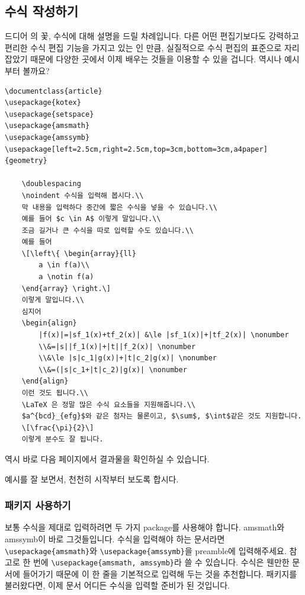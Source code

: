 
\newpage
\subsection{수식 작성하기}
\label{subsec:ams}
드디어 \lt 의 꽃, 수식에 대해 설명을 드릴 차례입니다.
다른 어떤 편집기보다도 강력하고 편리한 수식 편집 기능을 가지고 있는 \lt 인 만큼, 실질적으로 수식 편집의 표준으로 자리 잡았기 때문에 다양한 곳에서 이제 배우는 것들을 이용할 수 있을 겁니다.
역시나 예시부터 볼까요?

\begin{Verbatim}[frame=single]
\documentclass{article}
\usepackage{kotex}
\usepackage{setspace}
\usepackage{amsmath}
\usepackage{amssymb}
\usepackage[left=2.5cm,right=2.5cm,top=3cm,bottom=3cm,a4paper]{geometry}

	\doublespacing
	\noindent 수식을 입력해 봅시다.\\
	막 내용을 입력하다 중간에 짧은 수식을 넣을 수 있습니다.\\
	예를 들어 $c \in A$ 이렇게 말입니다.\\
	조금 길거나 큰 수식을 따로 입력할 수도 있습니다.\\
	예를 들어
	\[\left\{ \begin{array}{ll}
		a \in f(a)\\
		a \notin f(a)
	\end{array} \right.\]
	이렇게 말입니다.\\
	심지어
	\begin{align}
		|f(x)|=|sf_1(x)+tf_2(x)| &\le |sf_1(x)|+|tf_2(x)| \nonumber
		\\&=|s||f_1(x)|+|t||f_2(x)| \nonumber
		\\&\le |s|c_1|g(x)|+|t|c_2|g(x)| \nonumber
		\\&=(|s|c_1+|t|c_2)|g(x)| \nonumber
	\end{align}
	이런 것도 됩니다.\\
	\LaTeX 은 정말 많은 수식 요소들을 지원해줍니다.\\
	$a^{bcd}_{efg}$와 같은 첨자는 물론이고, $\sum$, $\int$같은 것도 지원합니다.
	\[\frac{\pi}{2}\]
	이렇게 분수도 잘 됩니다.

\end{Verbatim}
역시 바로 다음 페이지에서 결과물을 확인하실 수 있습니다.



예시를 잘 보면서, 천천히 시작부터 보도록 합시다.

\subsubsection{패키지 사용하기}
\label{subsec:ams-package}
보통 수식을 제대로 입력하려면 두 가지 package를 사용해야 합니다.
amsmath와 amssymb이 바로 그것들입니다.
수식을 입력해야 하는 문서라면 \verb|\usepackage{amsmath}|와 \verb|\usepackage{amssymb}|을 preamble에 입력해주세요.
참고로 한 번에 \verb|\usepackage{amsmath, amssymb}|라 쓸 수 있습니다.
수식은 웬만한 문서에 들어가기 때문에 이 한 줄을 기본적으로 입력해 두는 것을 추천합니다.
패키지를 불러왔다면, 이제 문서 어디든 수식을 입력할 준비가 된 것입니다.

